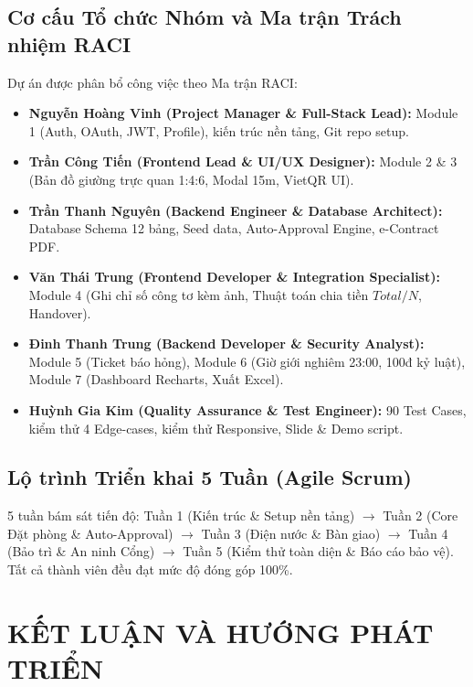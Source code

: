 \documentclass[12pt,a4paper,oneside]{report}
\begin{document}
\section{Cơ cấu Tổ chức Nhóm và Ma trận Trách nhiệm RACI}
Dự án được phân bổ công việc theo Ma trận RACI:
\begin{itemize}
    \item \textbf{Nguyễn Hoàng Vinh (Project Manager \& Full-Stack Lead):} Module 1 (Auth, OAuth, JWT, Profile), kiến trúc nền tảng, Git repo setup.
    \item \textbf{Trần Công Tiến (Frontend Lead \& UI/UX Designer):} Module 2 \& 3 (Bản đồ giường trực quan 1:4:6, Modal 15m, VietQR UI).
    \item \textbf{Trần Thanh Nguyên (Backend Engineer \& Database Architect):} Database Schema 12 bảng, Seed data, Auto-Approval Engine, e-Contract PDF.
    \item \textbf{Văn Thái Trung (Frontend Developer \& Integration Specialist):} Module 4 (Ghi chỉ số công tơ kèm ảnh, Thuật toán chia tiền $Total/N$, Handover).
    \item \textbf{Đinh Thanh Trung (Backend Developer \& Security Analyst):} Module 5 (Ticket báo hỏng), Module 6 (Giờ giới nghiêm 23:00, 100đ kỷ luật), Module 7 (Dashboard Recharts, Xuất Excel).
    \item \textbf{Huỳnh Gia Kim (Quality Assurance \& Test Engineer):} 90 Test Cases, kiểm thử 4 Edge-cases, kiểm thử Responsive, Slide \& Demo script.
\end{itemize}

\section{Lộ trình Triển khai 5 Tuần (Agile Scrum)}
5 tuần bám sát tiến độ: Tuần 1 (Kiến trúc \& Setup nền tảng) $\rightarrow$ Tuần 2 (Core Đặt phòng \& Auto-Approval) $\rightarrow$ Tuần 3 (Điện nước \& Bàn giao) $\rightarrow$ Tuần 4 (Bảo trì \& An ninh Cổng) $\rightarrow$ Tuần 5 (Kiểm thử toàn diện \& Báo cáo bảo vệ). Tất cả thành viên đều đạt mức độ đóng góp 100\%.

\chapter{KẾT LUẬN VÀ HƯỚNG PHÁT TRIỂN}
\label{ch:conclusion}
\end{document}
